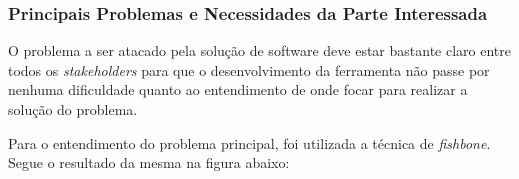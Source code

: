 
\subsubsection{Principais Problemas e Necessidades da Parte Interessada}

O problema a ser atacado pela solução de software deve estar bastante claro entre todos os \textit{stakeholders} para que o desenvolvimento da ferramenta não passe por nenhuma dificuldade quanto ao entendimento de onde focar para realizar a solução do problema.

Para o entendimento do problema principal, foi utilizada a técnica de \textit{fishbone}. Segue o resultado da mesma na figura abaixo:

